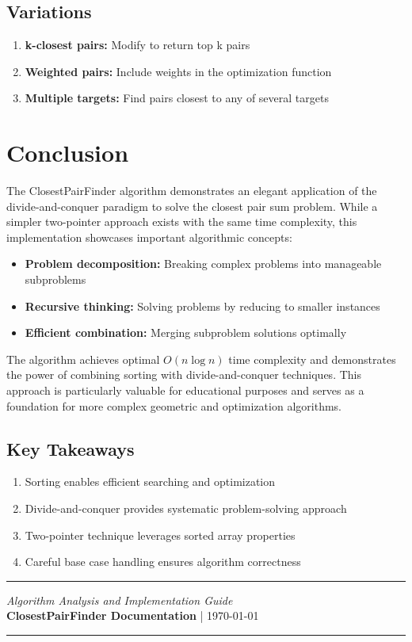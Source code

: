 \documentclass[12pt,a4paper]{article}
\begin{document}
\subsection{Variations}

\begin{enumerate}
    \item \textbf{k-closest pairs:} Modify to return top k pairs
    \item \textbf{Weighted pairs:} Include weights in the optimization function
    \item \textbf{Multiple targets:} Find pairs closest to any of several targets
\end{enumerate}

\section{Conclusion}

The ClosestPairFinder algorithm demonstrates an elegant application of the divide-and-conquer paradigm to solve the closest pair sum problem. While a simpler two-pointer approach exists with the same time complexity, this implementation showcases important algorithmic concepts:

\begin{itemize}
    \item \textbf{Problem decomposition:} Breaking complex problems into manageable subproblems
    \item \textbf{Recursive thinking:} Solving problems by reducing to smaller instances
    \item \textbf{Efficient combination:} Merging subproblem solutions optimally
\end{itemize}

The algorithm achieves optimal $O(n \log n)$ time complexity and demonstrates the power of combining sorting with divide-and-conquer techniques. This approach is particularly valuable for educational purposes and serves as a foundation for more complex geometric and optimization algorithms.

\subsection{Key Takeaways}

\begin{enumerate}
    \item Sorting enables efficient searching and optimization
    \item Divide-and-conquer provides systematic problem-solving approach
    \item Two-pointer technique leverages sorted array properties
    \item Careful base case handling ensures algorithm correctness
\end{enumerate}

\vfill
\begin{center}
\rule{\textwidth}{1pt}
\vspace{0.5em}
\textit{Algorithm Analysis and Implementation Guide}\\
\textbf{ClosestPairFinder Documentation} | \today
\vspace{0.5em}
\rule{\textwidth}{1pt}
\end{center}
\end{document}
